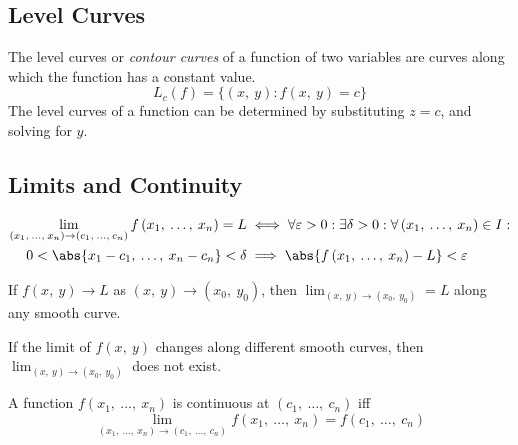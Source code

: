\documentclass{article}
\begin{document}
\subsection{Level Curves}
\begin{definition}
    The level curves or \textit{contour curves} of a function of two
    variables are curves along which the function has a constant value.
    \begin{equation*}
        L_c\left( f \right) = \bigl\{ \left( x,\: y \right) : f\left(x,\: y\right) = c\bigr\}
    \end{equation*}
    The level curves of a function can be determined by substituting
    \(z = c\), and solving for \(y\).
\end{definition}
\subsection{Limits and Continuity}
\begin{definition}
    \begin{align*}
        \lim_{\left( x_1,\: \ldots,\: x_n \right)\to \left( c_1,\: \ldots,\: c_n \right)} f\left( x_1,\: \ldots,\: x_n \right) = L
                                                    & \iff\forall\varepsilon>0: \exists\delta>0: \forall \left( x_1,\: \ldots,\: x_n \right) \in I: \\
        0<\abs{x_1-c_1,\: \ldots,\: x_n-c_n}<\delta & \implies \abs{f\left( x_1,\: \ldots,\: x_n \right)-L}<\varepsilon
    \end{align*}
\end{definition}
\begin{theorem}
    If \(f\left( x,\: y \right) \to L\) as \(\left( x,\: y \right) \to \left( x_0,\: y_0 \right)\), then
    \(\displaystyle \lim_{\left( x,\: y \right) \to \left( x_0,\: y_0 \right)} = L\) along any
    smooth curve.
\end{theorem}
\begin{theorem}
    If the limit of \(f\left( x,\: y \right)\) changes along different smooth curves,
    then \(\displaystyle \lim_{\left( x,\: y \right) \to \left( x_0,\: y_0 \right)}\) does not
    exist.
\end{theorem}
\begin{theorem}
    A function \(f\left( x_1,\: \ldots,\: x_n \right)\) is continuous at
    \(\left( c_1,\: \ldots,\: c_n \right)\) iff
    \begin{equation*}
        \lim_{\left( x_1,\: \ldots,\: x_n \right)\to \left( c_1,\: \ldots,\: c_n \right)} f\left( x_1,\: \ldots,\: x_n \right) = f\left( c_1,\: \ldots,\: c_n \right)
    \end{equation*}
\end{theorem}
\end{document}
